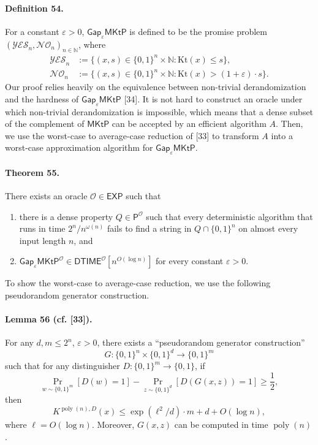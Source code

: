 \documentclass[10pt,a4paper]{article}
\begin{document}
\paragraph{Definition 54.} For a constant $\varepsilon>0$, $\mathsf{Gap}_{\varepsilon}\mathsf{MKtP}$ is defined to be the promise problem $(\mathcal{YES}_n,\mathcal{NO}_n)_{n\in\mathbb N}$, where
\begin{align*}
\mathcal{YES}_n&:=\{(x,s)\in\{0,1\}^n\times\mathbb N:\mathrm{Kt}(x)\leq s\},\\
\mathcal{NO}_n&:=\{(x,s)\in\{0,1\}^n\times\mathbb N:\mathrm{Kt}(x)>(1+\varepsilon)\cdot s\}.
\end{align*}
Our proof relies heavily on the equivalence between non-trivial derandomization and the hardness of $\mathsf{Gap}_{\varepsilon}\mathsf{MKtP}$ [34]. It is not hard to construct an oracle under which non-trivial derandomization is impossible, which means that a dense subset of the complement of $\mathsf{MKtP}$ can be accepted by an efficient algorithm $A$. Then, we use the worst-case to average-case reduction of [33] to transform $A$ into a worst-case approximation algorithm for $\mathsf{Gap}_{\varepsilon}\mathsf{MKtP}$.

\paragraph{Theorem 55.} There exists an oracle $\mathcal O\in\mathsf{EXP}$ such that
\begin{enumerate}
\item there is a dense property $Q\in\mathsf P^{\mathcal O}$ such that every deterministic algorithm that runs in time $2^n/n^{\omega(n)}$ fails to find a string in $Q\cap\{0,1\}^n$ on almost every input length $n$, and
\item $\mathsf{Gap}_{\varepsilon}\mathsf{MKtP}^{\mathcal O}\in\mathsf{DTIME}^{\mathcal O}[n^{O(\log n)}]$ for every constant $\varepsilon>0$.
\end{enumerate}

To show the worst-case to average-case reduction, we use the following pseudorandom generator construction.
\paragraph{Lemma 56 (cf. [33]).} For any $d,m\leq2^n$, $\varepsilon>0$, there exists a ``pseudorandom generator construction''
\[G:\{0,1\}^n\times\{0,1\}^d\to\{0,1\}^m\]
such that for any distinguisher $D:\{0,1\}^m\to\{0,1\}$, if
\[\Pr_{w\sim\{0,1\}^m}[D(w)=1]-\Pr_{z\sim\{0,1\}^d}[D(G(x,z))=1]\geq\frac12,\]
then
\[K^{\operatorname{poly}(n),D}(x)\leq\exp(\ell^2/d)\cdot m+d+O(\log n),\]
where $\ell=O(\log n)$. Moreover, $G(x,z)$ can be computed in time $\operatorname{poly}(n)$.
\end{document}
